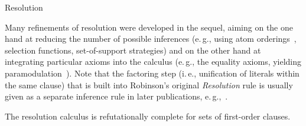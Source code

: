 \begin{entry}{Resolution}
\begin{history}
Many refinements of resolution were developed in the sequel,
aiming on the one hand at reducing the number of possible inferences
(e.\,g., using atom orderings~,
selection functions, set-of-support strategies)
and on the other hand at integrating particular axioms
into the calculus
(e.\,g., the equality axioms, yielding paramodulation~).
Note that the factoring step (i.\,e., unification of literals
within the same clause) that is built into Robinson's original
\textit{Resolution} rule is usually given as a separate inference
rule in later publications, e.\,g.,~.

\end{history}

\begin{technicalities}
The resolution calculus is refutationally complete for
sets of first-order clauses.
\end{technicalities}



%
%
%
%
%
%
% 
%












\end{entry}
